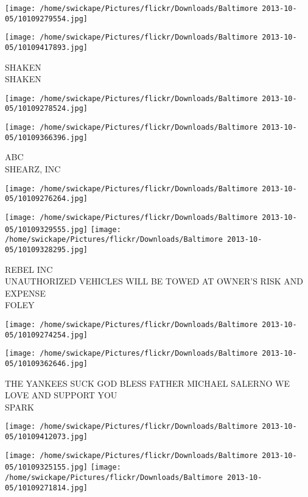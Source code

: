 \documentclass[10pt,letterpaper]{article}
\begin{document}
\texttt{[image: /home/swickape/Pictures/flickr/Downloads/Baltimore 2013-10-05/10109279554.jpg]}

\vspace{0.25in}
\texttt{[image: /home/swickape/Pictures/flickr/Downloads/Baltimore 2013-10-05/10109417893.jpg]}

SHAKEN\\
SHAKEN\\
\pagebreak

\texttt{[image: /home/swickape/Pictures/flickr/Downloads/Baltimore 2013-10-05/10109278524.jpg]}

\vspace{0.25in}
\texttt{[image: /home/swickape/Pictures/flickr/Downloads/Baltimore 2013-10-05/10109366396.jpg]}

ABC\\
SHEARZ, INC\\
\pagebreak

\texttt{[image: /home/swickape/Pictures/flickr/Downloads/Baltimore 2013-10-05/10109276264.jpg]}

\vspace{0.25in}
\texttt{[image: /home/swickape/Pictures/flickr/Downloads/Baltimore 2013-10-05/10109329555.jpg]}
\texttt{[image: /home/swickape/Pictures/flickr/Downloads/Baltimore 2013-10-05/10109328295.jpg]}

REBEL INC\\
UNAUTHORIZED VEHICLES WILL BE TOWED AT OWNER'S RISK AND EXPENSE\\
FOLEY\\
\pagebreak

\texttt{[image: /home/swickape/Pictures/flickr/Downloads/Baltimore 2013-10-05/10109274254.jpg]}

\vspace{0.25in}
\texttt{[image: /home/swickape/Pictures/flickr/Downloads/Baltimore 2013-10-05/10109362646.jpg]}

THE YANKEES SUCK GOD BLESS FATHER MICHAEL SALERNO WE LOVE AND SUPPORT YOU\\
SPARK\\
\pagebreak

\texttt{[image: /home/swickape/Pictures/flickr/Downloads/Baltimore 2013-10-05/10109412073.jpg]}

\vspace{0.25in}
\texttt{[image: /home/swickape/Pictures/flickr/Downloads/Baltimore 2013-10-05/10109325155.jpg]}
\texttt{[image: /home/swickape/Pictures/flickr/Downloads/Baltimore 2013-10-05/10109271814.jpg]}
\end{document}
